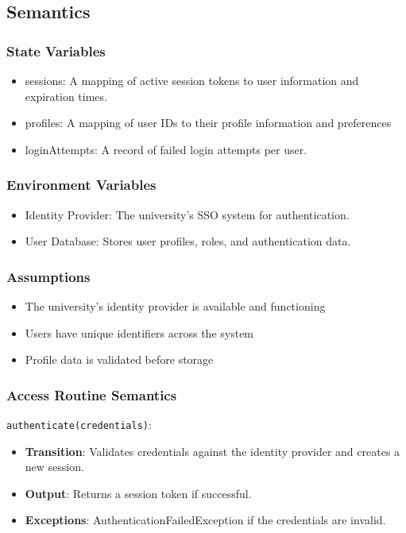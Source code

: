 \documentclass[12pt, titlepage]{article}
\begin{document}
\subsection{Semantics}

\subsubsection{State Variables}
\begin{itemize}
    \item sessions: A mapping of active session tokens to user information and expiration times.
    \item profiles: A mapping of user IDs to their profile information and preferences
    \item loginAttempts: A record of failed login attempts per user.
\end{itemize}

\subsubsection{Environment Variables}
\begin{itemize}
    \item Identity Provider: The university's SSO system for authentication.
    \item User Database: Stores user profiles, roles, and authentication data.
\end{itemize}

\subsubsection{Assumptions}
\begin{itemize}
    \item The university's identity provider is available and functioning
    \item Users have unique identifiers across the system
    \item Profile data is validated before storage
\end{itemize}

\subsubsection{Access Routine Semantics}
\noindent \texttt{authenticate(credentials)}:
\begin{itemize}
    \item \textbf{Transition}: Validates credentials against the identity provider and creates a new session.
    \item \textbf{Output}: Returns a session token if successful.
    \item \textbf{Exceptions}: AuthenticationFailedException if the credentials are invalid.
\end{itemize}
\end{document}
